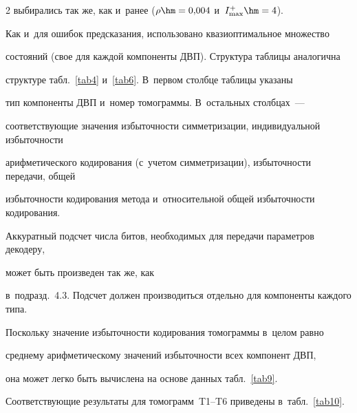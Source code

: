\begin{multicols}{2}
выбирались так же, как и~ранее ($\rho\hm= 0{,}004$ и~$I_{\max}^+\hm=4$). 

Как и~для ошибок предсказания, использовано квазиоптимальное множество 

состояний (свое для каждой компоненты ДВП). Структура таблицы аналогична 

структу\-ре табл.~\ref{tab4} и~\ref{tab6}. В~первом столбце таблицы указаны 

тип компоненты ДВП и~номер томограммы. В~остальных столбцах~--- 

соответствующие значения из\-бы\-точ\-ности симметризации, индивидуальной из\-бы\-точ\-ности 

арифметического кодирования (с~учетом симметризации), избыточности передачи, общей 

избыточности кодирования метода и~относительной общей избыточности кодирования. 

Аккуратный подсчет числа битов, необходимых для передачи параметров декодеру, 

может быть произведен так же, как 

в~подразд.~4.3. Подсчет должен производиться отдельно для компоненты каждого типа.









Поскольку значение избыточности кодирования томограммы в~целом равно 

среднему арифметическому значений избыточности всех компонент ДВП, 

она может легко быть вычислена на основе данных табл.~\ref{tab9}. 

Соответствующие результаты для томограмм~T1--T6 приведены в~табл.~\ref{tab10}.




\begin{table}[b]\small

\vspace*{-9pt}

\begin{center}


\label{tab11}

\vspace{2ex}



\begin{tabular}{|c|c|c|c|c|}


\end{tabular}
\end{center}
\end{table}
\end{multicols}
